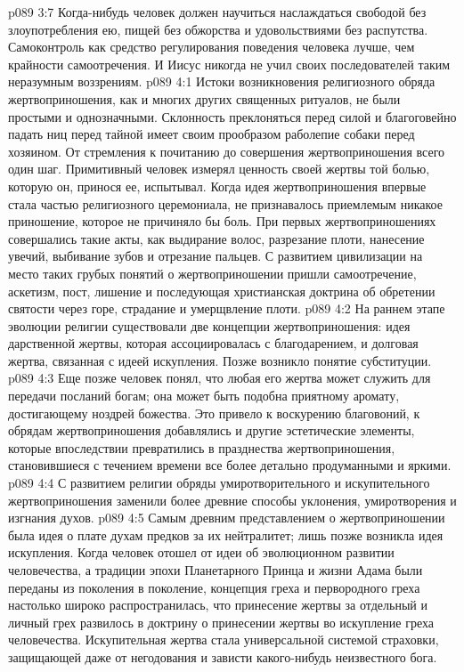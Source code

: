 \vs p089 3:7 \pc Когда\hyp{}нибудь человек должен научиться наслаждаться свободой без злоупотребления ею, пищей без обжорства и удовольствиями без распутства. Самоконтроль как средство регулирования поведения человека лучше, чем крайности самоотречения. И Иисус никогда не учил своих последователей таким неразумным воззрениям.
\vs p089 4:1 Истоки возникновения религиозного обряда жертвоприношения, как и многих других священных ритуалов, не были простыми и однозначными. Склонность преклоняться перед силой и благоговейно падать ниц перед тайной имеет своим прообразом раболепие собаки перед хозяином. От стремления к почитанию до совершения жертвоприношения всего один шаг. Примитивный человек измерял ценность своей жертвы той болью, которую он, принося ее, испытывал. Когда идея жертвоприношения впервые стала частью религиозного церемониала, не признавалось приемлемым никакое приношение, которое не причиняло бы боль. При первых жертвоприношениях совершались такие акты, как выдирание волос, разрезание плоти, нанесение увечий, выбивание зубов и отрезание пальцев. С развитием цивилизации на место таких грубых понятий о жертвоприношении пришли самоотречение, аскетизм, пост, лишение и последующая христианская доктрина об обретении святости через горе, страдание и умерщвление плоти.
\vs p089 4:2 На раннем этапе эволюции религии существовали две концепции жертвоприношения: идея дарственной жертвы, которая ассоциировалась с благодарением, и долговая жертва, связанная с идеей искупления. Позже возникло понятие субституции.
\vs p089 4:3 Еще позже человек понял, что любая его жертва может служить для передачи посланий богам; она может быть подобна приятному аромату, достигающему ноздрей божества. Это привело к воскурению благовоний, к обрядам жертвоприношения добавлялись и другие эстетические элементы, которые впоследствии превратились в празднества жертвоприношения, становившиеся с течением времени все более детально продуманными и яркими.
\vs p089 4:4 \pc С развитием религии обряды умиротворительного и искупительного жертвоприношения заменили более древние способы уклонения, умиротворения и изгнания духов.
\vs p089 4:5 Самым древним представлением о жертвоприношении была идея о плате духам предков за их нейтралитет; лишь позже возникла идея искупления. Когда человек отошел от идеи об эволюционном развитии человечества, а традиции эпохи Планетарного Принца и жизни Адама были переданы из поколения в поколение, концепция греха и первородного греха настолько широко распространилась, что принесение жертвы за отдельный и личный грех развилось в доктрину о принесении жертвы во искупление греха человечества. Искупительная жертва стала универсальной системой страховки, защищающей даже от негодования и зависти какого\hyp{}нибудь неизвестного бога.
